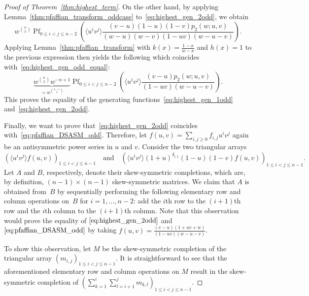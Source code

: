 \documentclass[ALCO, Unicode]{cedram}
\DeclareMathOperator*{\pf}{Pf}
\begin{document}
\begin{proof}[Proof of Theorem~\ref{thm:highest_term}]
		On the other hand, by applying Lemma~\ref{thm:pfaffian_transform_oddcase} to~\eqref{eq:highest_gen_2odd}, we obtain
		\begin{equation*}
			w^{\binom{n}{2}} \pf_{0 \le i < j \le n-2} \left(\langle u^i v^j\rangle  \frac{(v-u)(1-u)(1-v) p_2(w;u,v)}{(w-u)(w-v)(1-u v)(w-u-v)} \right).
		\end{equation*}
		Applying Lemma~\ref{thm:pfaffian_transform} with $k(x)=\frac{1-x}{w-x}$ and $h(x)=1$ to the previous expression then yields the following which coincides with~\eqref{eq:highest_gen_odd_equal}:
		\begin{equation*}
			\underbrace{w^{\binom{n}{2}} w^{-n+1}}_{=w^{\binom{n-1}{2}}} \pf_{0 \le i < j \le n-2} \left(\langle u^i v^j\rangle  \frac{(v-u) p_2(w;u,v)}{(1-u v)(w-u-v)} \right).
		\end{equation*}
		This proves the equality of the generating functions~\eqref{eq:highest_gen_1odd} and~\eqref{eq:highest_gen_2odd}.
		
		Finally, we want to prove that~\eqref{eq:highest_gen_2odd} coincides with~\eqref{eq:pfaffian_DSASM_odd}. Therefore, let $f(u,v) = \sum_{i,j \ge 0} f_{i,j} u^i v^j$ again be an antisymmetric power series in $u$ and $v$. Consider the two triangular arrays
		\begin{equation*}
			\left(\langle u^i v^j\rangle f(u,v) \right)_{1 \le i < j \le n-1}\quad\text{and}\quad \left(\langle u^i v^j\rangle (1+u)^{\delta_{i,1}} (1-u)(1-v) f(u,v) \right)_{1 \le i < j \le n-1}.
		\end{equation*}
		Let $A$ and $B$, respectively, denote their skew-symmetric completions, which are, by definition, $(n-1) \times (n-1)$ skew-symmetric matrices. We claim that $A$ is obtained from~$B$ by sequentially performing the following elementary row and column operations on~$B$ for $i=1,\dots,n-2$: add the $i$th row to the $(i+1)$th row and the $i$th column to the $(i+1)$th column. Note that this observation would prove the equality of $\eqref{eq:highest_gen_2odd}$ and $\eqref{eq:pfaffian_DSASM_odd}$ by taking $f(u,v)=\frac{(v-u)(1+u v+w)}{(1-u v)(w- u-v)}$.
		
		To show this observation, let $M$ be the skew-symmetric completion of the triangular array $( m_{i,j} )_{1 \le i < j \le n-1}$. It is straightforward to see that the aforementioned elementary row and column operations on $M$ result in the skew-symmetric completion of $\left( \sum_{k=1}^{i} \sum_{l=i+1}^{j} m_{k,l} \right)_{1 \le i < j \le  n-1}$.
		

\end{proof}
\end{document}

